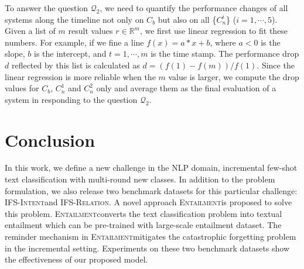 \documentclass[11pt]{article}
\newcommand{\modelname}{\textsc{Entailment}}
\newcommand{\intentdata}{\textsc{IFS-Intent}}
\newcommand{\relationdata}{\textsc{IFS-Relation}}
\begin{document}
To answer the question $\mathcal{Q}_2$, we need to quantify the performance changes of all systems  along the timeline not only on $C_b$ but also on all \{$C_n^i$\} ($i=1,\cdots, 5$). Given a list of $m$ result values $r\in\mathbb{R}^m$, we first use linear regression to fit these numbers. For example, if we fine a line $f(x)=a*x+b$, where $a<0$ is the slope,  $b$ is the intercept, and $t=1, \cdots, m$ is the time stamp. The performance drop $d$ reflected by this list is calculated as $d= (f(1)-f(m))/f(1)$. Since the linear regression is more reliable when the $m$ value is larger, we compute the drop values for $C_b$, $C_n^1$ and $C_n^2$ only and average them as the final evaluation of a system in responding to  the question $\mathcal{Q}_2$.

\section{Conclusion}
In this work, we define a new challenge in the NLP domain, incremental few-shot text classification with multi-round new classes. In addition to the problem formulation, we also release two benchmark datasets for this particular challenge: \intentdata\enspace and \relationdata\enspace. A novel approach \modelname\enspace is proposed to solve this problem. \modelname\enspace converts the text classification problem into textual entailment which can be pre-trained with large-scale entailment dataset. The reminder mechanism in \modelname\enspace mitigates the catastrophic forgetting problem in the incremental setting. Experiments on these two benchmark datasets show the effectiveness of our proposed model.



\end{document}
